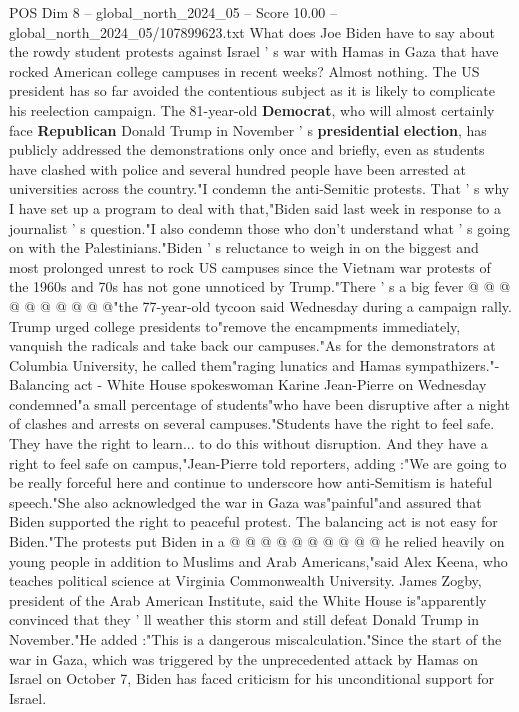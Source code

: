 \begin{textsample}{POS Dim 8 – global\_north\_2024\_05 – Score 10.00 – global\_north\_2024\_05/107899623.txt}  \label{ex:f8_pos_075}
What does Joe Biden have to say about the rowdy student protests against Israel ' s war with Hamas in Gaza that have rocked American college campuses in recent weeks?
Almost nothing.
The US president has so far avoided the contentious subject as it is likely to complicate his reelection campaign.
The 81-year-old \textbf{Democrat}, who will almost certainly face \textbf{Republican} Donald Trump in November ' s \textbf{presidential} \textbf{election}, has publicly addressed the demonstrations only once and briefly, even as students have clashed with police and several hundred people have been arrested at universities across the country."I condemn the anti-Semitic protests.
That ' s why I have set up a program to deal with that,"Biden said last week in response to a journalist ' s question."I also condemn those who don't understand what ' s going on with the Palestinians."Biden ' s reluctance to weigh in on the biggest and most prolonged unrest to rock US campuses since the Vietnam war protests of the 1960s and 70s has not gone unnoticed by Trump."There ' s a big fever @ @ @ @ @ @ @ @ @ @"the 77-year-old tycoon said Wednesday during a campaign rally.
Trump urged college presidents to"remove the encampments immediately, vanquish the radicals and take back our campuses."As for the demonstrators at Columbia University, he called them"raging lunatics and Hamas sympathizers."- Balancing act - White House spokeswoman Karine Jean-Pierre on Wednesday condemned"a small percentage of students"who have been disruptive after a night of clashes and arrests on several campuses."Students have the right to feel safe.
They have the right to learn... to do this without disruption.
And they have a right to feel safe on campus,"Jean-Pierre told reporters, adding :"We are going to be really forceful here and continue to underscore how anti-Semitism is hateful speech."She also acknowledged the war in Gaza was"painful"and assured that Biden supported the right to peaceful protest.
The balancing act is not easy for Biden."The protests put Biden in a @ @ @ @ @ @ @ @ @ @ he relied heavily on young people in addition to Muslims and Arab Americans,"said Alex Keena, who teaches political science at Virginia Commonwealth University.
James Zogby, president of the Arab American Institute, said the White House is"apparently convinced that they ' ll weather this storm and still defeat Donald Trump in November."He added :"This is a dangerous miscalculation."Since the start of the war in Gaza, which was triggered by the unprecedented attack by Hamas on Israel on October 7, Biden has faced criticism for his unconditional support for Israel.

\end{textsample}
